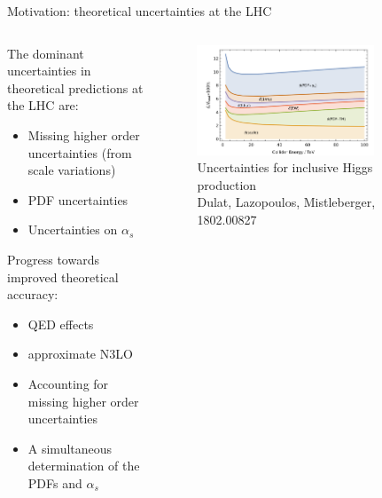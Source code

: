 \documentclass[8pt,t]{beamer}
\begin{document}
\begin{frame}{Motivation: theoretical uncertainties at the LHC}

  \begin{columns}
    \begin{column}{0.55\textwidth}
      The dominant uncertainties in theoretical predictions at the LHC are:
      \begin{itemize}
        \item Missing higher order uncertainties (from scale variations)
        \item PDF uncertainties
        \item Uncertainties on $\alpha_s$
      \end{itemize}

      \vspace*{0.5em}
      Progress towards improved theoretical accuracy:
      \begin{itemize}
        \item QED effects
        \item approximate N3LO
        \item Accounting for missing higher order uncertainties
        \item A simultaneous determination of the PDFs and $\alpha_s$
      \end{itemize}
    \end{column}
    \begin{column}{0.44\textwidth}
      \begin{figure}
        \centering
        \includegraphics[width=0.8\textwidth]{figures/sources_of_unc_higgs.png}
        \caption*{ \small Uncertainties for inclusive Higgs production \\  {\color{gray}\footnotesize Dulat, Lazopoulos, Mistleberger, 1802.00827}}
      \end{figure}
    \end{column}
  \end{columns}
\end{frame}
\end{document}
